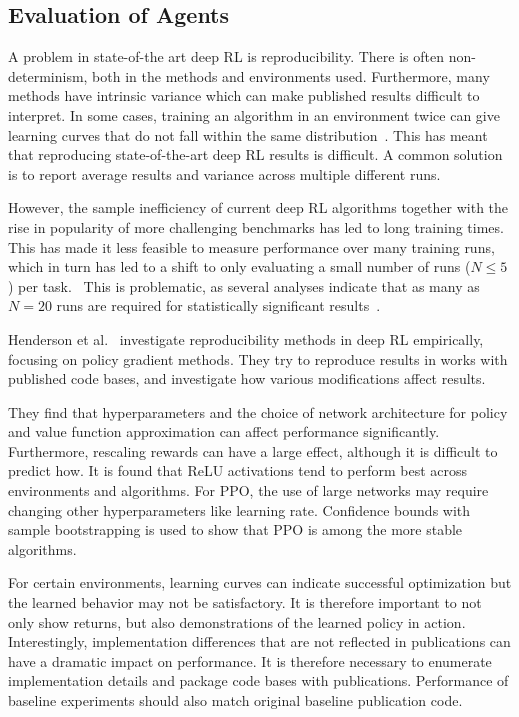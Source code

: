 \subsection{Evaluation of Agents}
\label{sec:theory-evaluation}

A problem in state-of-the art deep RL is reproducibility.
There is often non-determinism, both in the methods and environments used.
Furthermore, many methods have intrinsic variance which can make published results difficult to interpret.
In some cases, training an algorithm in an environment twice can give learning curves that do not fall within the same distribution~\cite{henderson_matters_2018}.
This has meant that reproducing state-of-the-art deep RL results is difficult.
A common solution is to report average results and variance across multiple different runs.

However, the sample inefficiency of current deep RL algorithms together with the rise in popularity of more challenging benchmarks has led to long training times.
This has made it less feasible to measure performance over many training runs,
which in turn has led to a shift to only evaluating a small number of runs (\(N \leq 5\)) per task.~\cite{agarwal_rlliable_2022}
This is problematic, as several analyses indicate that as many as \(N = 20\) runs are required for statistically significant results~\cite{colas_seeds_2018,colas_hitchhiker_2019}.

Henderson et al.~\cite{henderson_matters_2018} investigate reproducibility methods in deep RL empirically, focusing on policy gradient methods.
They try to reproduce results in works with published code bases, and investigate how various modifications affect results.

They find that hyperparameters and the choice of network architecture for policy and value function approximation can affect performance significantly.
Furthermore, rescaling rewards can have a large effect, although it is difficult to predict how.
It is found that ReLU activations tend to perform best across environments and algorithms.
For PPO, the use of large networks may require changing other hyperparameters like learning rate.
Confidence bounds with sample bootstrapping is used to show that PPO is among the more stable algorithms.

For certain environments, learning curves can indicate successful optimization but the learned behavior may not be satisfactory.
It is therefore important to not only show returns, but also demonstrations of the learned policy in action.
Interestingly, implementation differences that are not reflected in publications can have a dramatic impact on performance.
It is therefore necessary to enumerate implementation details and package code bases with publications.
Performance of baseline experiments should also match original baseline publication code.

